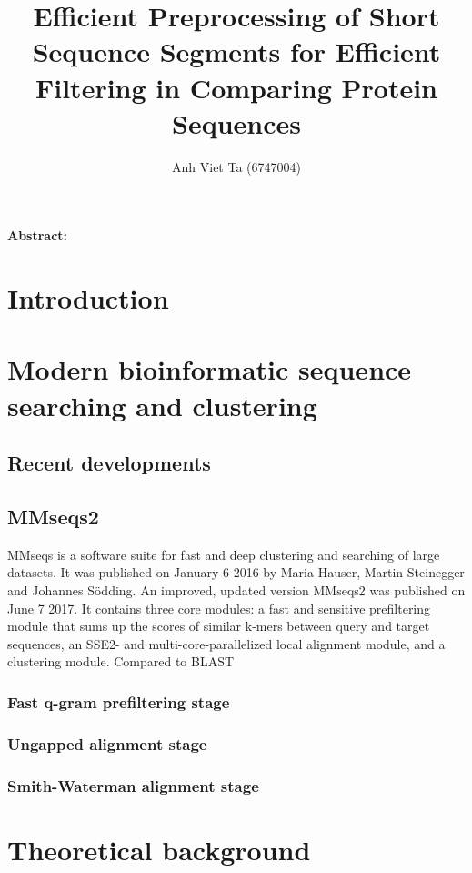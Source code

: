 \documentclass[11pt,a4paper]{scrartcl}
\title{Efficient Preprocessing of Short Sequence Segments for Efficient Filtering in Comparing Protein Sequences}
\author{Anh Viet Ta (6747004)}
\begin{document}
\begin{titlepage}
\maketitle
{}%
\thispagestyle{empty}

\textbf{Abstract:} 
\end{titlepage}
\setcounter{page}{1}

\section{Introduction}
\section{Modern bioinformatic sequence searching and clustering}
\subsection{Recent developments}

\subsection{MMseqs2}
MMseqs is a software suite for fast and deep clustering and searching of large datasets. It was published on January 6 2016 by Maria Hauser, Martin Steinegger and Johannes S\"odding. An improved, updated version MMseqs2 was published on June 7 2017. It contains three core modules: a fast and sensitive preﬁltering module that sums up the scores of similar k-mers between query and target sequences, an SSE2- and multi-core-parallelized local alignment module, and a clustering module. Compared to BLAST
\subsubsection{Fast q-gram prefiltering stage}

\subsubsection{Ungapped alignment stage}

\subsubsection{Smith-Waterman alignment stage}

\section{Theoretical background}
\end{document}
